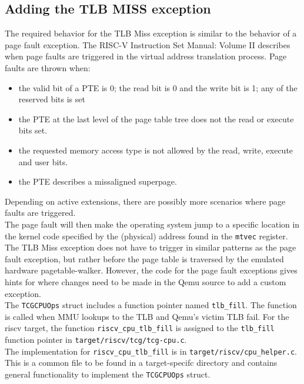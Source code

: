 \subsection{Adding the TLB MISS exception}
The required behavior for the TLB Miss exception is similar to the behavior of a page fault exception.
The RISC-V Instruction Set Manual: Volume II \cite{RISCVInstructionSet} describes when page faults
are triggered in the virtual address translation process. Page faults are thrown when:
\begin{itemize}
    \item the valid bit of a PTE is 0; the read bit is 0 and the write bit is 1; any of the reserved
          bits is set
    \item the PTE at the last level of the page table tree does not the read or execute bits set.
    \item the requested memory access type is not allowed by the read, write, execute and user bits.
    \item the PTE describes a missaligned superpage.
\end{itemize}
Depending on active extensions, there are possibly more scenarios where page faults are triggered.\\
The page fault will then make the operating system jump to a specific location in the kernel code
specified by the (physical) address found in the \texttt{mtvec} register.\\
The TLB Miss exception does not have to trigger in similar patterns as the page fault exception, but rather
before the page table is traversed by the emulated hardware pagetable-walker.
However, the code for the page fault exceptions gives hints for where changes need to be made in the Qemu
source to add a custom exception.\\
The \texttt{TCGCPUOps} struct includes a function pointer named \texttt{tlb\_fill}. The function is called
when MMU lookups to the TLB and Qemu's victim TLB fail.
For the riscv target, the function \texttt{riscv\_cpu\_tlb\_fill} is assigned to the \texttt{tlb\_fill}
function pointer in \texttt{target/riscv/tcg/tcg-cpu.c}.\\
The implementation for \texttt{riscv\_cpu\_tlb\_fill} is in \texttt{target/riscv/cpu\_helper.c}. This is a common
file to be found in a target-specifc directory and contains general functionality to implement the \texttt{TCGCPUOps} struct.\\


